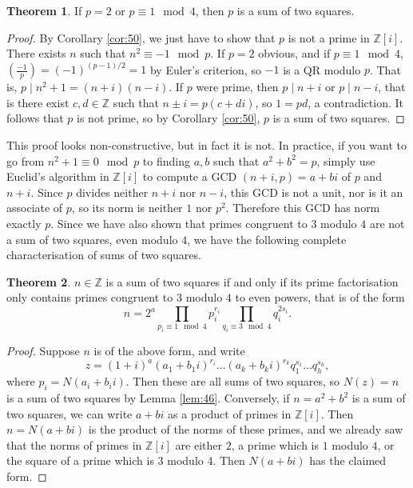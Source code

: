 \documentclass{article}
\newcommand{\Z}{\mathbb{Z}}
\newcommand{\rb}[1]{\left( #1 \right)}
\renewcommand{\sb}[1]{\left[ #1 \right]}
\newcommand{\legendre}[2]{\rb{\tfrac{#1}{#2}}}
\theoremstyle{definition}\newtheorem{definition}{Definition}
\theoremstyle{definition}\newtheorem{remark}[definition]{Remark}
\theoremstyle{definition}\newtheorem*{example}{Example}
\theoremstyle{definition}\newtheorem*{note}{Note}
\newtheorem{theorem}[definition]{Theorem}
\begin{document}
\begin{theorem}
If $ p = 2 $ or $ p \equiv 1 \mod 4 $, then $ p $ is a sum of two squares.
\end{theorem}

\begin{proof}
By Corollary \ref{cor:50}, we just have to show that $ p $ is not a prime in $ \Z\sb{i} $. There exists $ n $ such that $ n^2 \equiv -1 \mod p $. If $ p = 2 $ obvious, and if $ p \equiv 1 \mod 4 $, $ \legendre{-1}{p} = \rb{-1}^{\rb{p - 1} / 2} = 1 $ by Euler's criterion, so $ -1 $ is a QR modulo $ p $. That is, $ p \mid n^2 + 1 = \rb{n + i}\rb{n - i} $. If $ p $ were prime, then $ p \mid n + i $ or $ p \mid n - i $, that is there exist $ c, d \in \Z $ such that $ n \pm i = p\rb{c + di} $, so $ 1 = pd $, a contradiction. It follows that $ p $ is not prime, so by Corollary \ref{cor:50}, $ p $ is a sum of two squares.
\end{proof}

This proof looks non-constructive, but in fact it is not. In practice, if you want to go from $ n^2 + 1 \equiv 0 \mod p $ to finding $ a, b $ such that $ a^2 + b^2 = p $, simply use Euclid's algorithm in $ \Z\sb{i} $ to compute a GCD $ \rb{n + i, p} = a + bi $ of $ p $ and $ n + i $. Since $ p $ divides neither $ n + i $ nor $ n - i $, this GCD is not a unit, nor is it an associate of $ p $, so its norm is neither $ 1 $ nor $ p^2 $. Therefore this GCD has norm exactly $ p $. Since we have also shown that primes congruent to $ 3 $ modulo $ 4 $ are not a sum of two squares, even modulo $ 4 $, we have the following complete characterisation of sums of two squares.

\begin{theorem}
$ n \in \Z $ is a sum of two squares if and only if its prime factorisation only contains primes congruent to $ 3 $ modulo $ 4 $ to even powers, that is of the form
$$ n = 2^a\prod_{p_i \equiv 1 \mod 4} p_i^{r_i}\prod_{q_i \equiv 3 \mod 4} q_i^{2s_i}. $$
\end{theorem}

\begin{proof}
Suppose $ n $ is of the above form, and write
$$ z = \rb{1 + i}^a\rb{a_1 + b_1i}^{r_i} \dots \rb{a_k + b_ki}^{r_k}q_1^{s_1} \dots q_h^{s_h}, $$
where $ p_i = N\rb{a_i + b_ii} $. Then these are all sums of two squares, so $ N\rb{z} = n $ is a sum of two squares by Lemma \ref{lem:46}. Conversely, if $ n = a^2 + b^2 $ is a sum of two squares, we can write $ a + bi $ as a product of primes in $ \Z\sb{i} $. Then $ n = N\rb{a + bi} $ is the product of the norms of these primes, and we already saw that the norms of primes in $ \Z\sb{i} $ are either $ 2 $, a prime which is $ 1 $ modulo $ 4 $, or the square of a prime which is $ 3 $ modulo $ 4 $. Then $ N\rb{a + bi} $ has the claimed form.
\end{proof}
\end{document}
